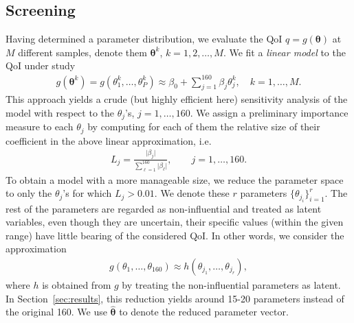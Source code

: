 \documentclass[smallextended]{svjour3}
\numberwithin{equation}{section}
\begin{document}
\subsection{Screening}
\label{sec:screen}
Having determined a parameter distribution, we evaluate the QoI $q=g(\boldsymbol{\theta})$ at $M$ different samples, denote them $\boldsymbol{\theta}^k$, $k=1,2,\dots,M$.
We fit a {\sl linear model} to the QoI under study
\begin{eqnarray}
g(\boldsymbol\theta^k) = g(\theta_1^k, \dots, \theta_P^k) \approx \beta_0 + \sum\limits_{j=1}^{160} \beta_j \theta_j^k, \quad k=1, \dots, M. \label{lr}
\end{eqnarray}
This approach yields a crude (but highly efficient here) sensitivity analysis of the model with respect to the $\theta_j$'s, $j=1,\dots, 160$. We assign a preliminary importance measure to each $\theta_j$ by computing for each of them the relative size of their coefficient in the above linear approximation, i.e.
\begin{eqnarray*}
L_j = \frac{\vert \beta_j \vert}{\sum\limits_{\ell=1}^{160} \vert \beta_\ell \vert}, \qquad j=1,\dots,160.
\end{eqnarray*}
To obtain a model with a more manageable size, we reduce the parameter space to only the $\theta_j$'s for which $L_j>0.01$. We denote these $r$ parameters $\{ \theta_{j_i}\}_{i=1}^r$. The rest of the parameters are regarded as non-influential and treated as latent variables, even though they are uncertain, their specific values (within the given range) have little bearing of the considered QoI. In other words, we consider the approximation 
\begin{eqnarray}
g(\theta_1, \dots, \theta_{160}) \approx h(\theta_{j_1}, \dots, \theta_{j_r}), \label{reddim}
\end{eqnarray}
where $h$ is obtained from $g$ by treating the non-influential parameters as latent. In Section~\ref{sec:results}, this reduction yields around 15-20 parameters instead of the original 160. We use $\hat{\boldsymbol{\theta}}$ to denote the reduced parameter vector.
\end{document}
